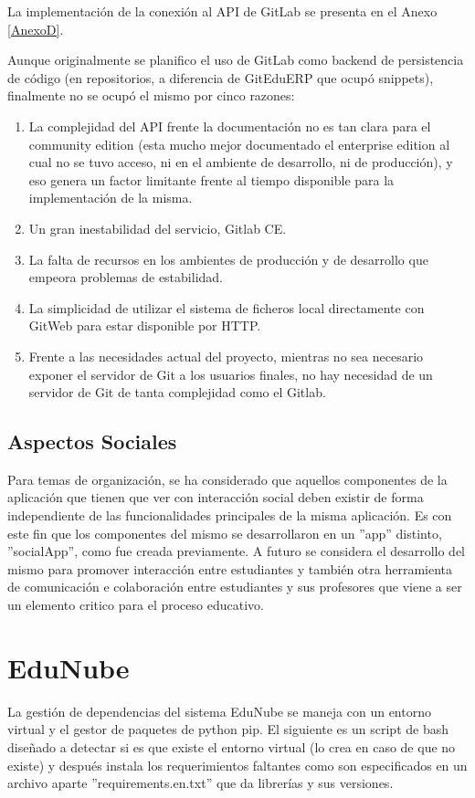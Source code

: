 La implementación de la conexión al API de GitLab se presenta en el Anexo \ref{AnexoD}.

Aunque originalmente se planifico el uso de GitLab como backend de persistencia de código (en repositorios, a diferencia de GitEduERP que ocupó snippets), finalmente no se ocupó el mismo por cinco razones:
\begin{enumerate}
  \item La complejidad del API frente la documentación no es tan clara para el community edition (esta mucho mejor documentado el enterprise edition al cual no se tuvo acceso, ni en el ambiente de desarrollo, ni de producción), y eso genera un factor limitante frente al tiempo disponible para la implementación de la misma.
  \item Un gran inestabilidad del servicio, Gitlab CE.
  \item La falta de recursos en los ambientes de producción y de desarrollo que empeora problemas de estabilidad.
  \item La simplicidad de utilizar el sistema de ficheros local directamente con GitWeb para estar disponible por HTTP.
  \item Frente a las necesidades actual del proyecto, mientras no sea necesario exponer el servidor de Git a los usuarios finales, no hay necesidad de un servidor de Git de tanta complejidad como el Gitlab.
\end{enumerate}

\subsection{Aspectos Sociales}
Para temas de organización, se ha considerado que aquellos componentes de la aplicación que tienen que ver con interacción social deben existir de forma independiente de las funcionalidades principales de la misma aplicación. Es con este fin que los componentes del mismo se desarrollaron en un ''app'' distinto, ''socialApp'', como fue creada previamente. A futuro se considera el desarrollo del mismo para promover interacción entre estudiantes y también otra herramienta de comunicación e colaboración entre estudiantes y sus profesores que viene a ser un elemento critico para el proceso educativo.

\section{EduNube}
La gestión de dependencias del sistema EduNube se maneja con un entorno virtual y el gestor de paquetes de python pip. El siguiente es un script de bash diseñado a detectar si es que existe el entorno virtual (lo crea en caso de que no existe) y después instala los requerimientos faltantes como son especificados en un archivo aparte ''requirements.en.txt'' que da librerías y sus versiones.

